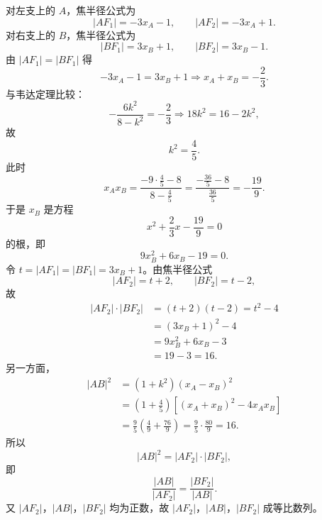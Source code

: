 \begin{answer}
对左支上的 $A$，焦半径公式为
\nopagebreak[4]
\[|AF_1|=-3x_A-1,\qquad |AF_2|=-3x_A+1.\]
对右支上的 $B$，焦半径公式为
\nopagebreak[4]
\[|BF_1|=3x_B+1,\qquad |BF_2|=3x_B-1.\]
由 $|AF_1|=|BF_1|$ 得
\nopagebreak[4]
\[-3x_A-1=3x_B+1
\Longrightarrow x_A+x_B=-\frac23.\]
与韦达定理比较：
\nopagebreak[4]
\[-\frac{6k^2}{8-k^2}=-\frac23
\Longrightarrow 18k^2=16-2k^2,\]
故
\nopagebreak[4]
\[k^2=\frac45.\]
此时
\nopagebreak[4]
\[x_Ax_B
=\frac{-9\cdot\frac45-8}{8-\frac45}
=\frac{-\frac{36}5-8}{\frac{36}5}
=-\frac{19}9.\]
于是 $x_B$ 是方程
\nopagebreak[4]
\[x^2+\frac23x-\frac{19}9=0\]
的根，即
\nopagebreak[4]
\[9x_B^2+6x_B-19=0.\]
令 $t=|AF_1|=|BF_1|=3x_B+1$。由焦半径公式
\nopagebreak[4]
\[|AF_2|=t+2,\qquad |BF_2|=t-2,\]
故
\nopagebreak[4]
\[\begin{aligned}
|AF_2|\cdot|BF_2|
&=(t+2)(t-2)=t^2-4\\
&=(3x_B+1)^2-4\\
&=9x_B^2+6x_B-3\\
&=19-3=16.
\end{aligned}\]
另一方面，
\nopagebreak[4]
\[\begin{aligned}
|AB|^2
&=(1+k^2)(x_A-x_B)^2\\
&=\left(1+\frac45\right)
\left[(x_A+x_B)^2-4x_Ax_B\right]\\
&=\frac95\left(\frac49+\frac{76}9\right)
=\frac95\cdot\frac{80}9=16.
\end{aligned}\]
所以
\nopagebreak[4]
\[|AB|^2=|AF_2|\cdot|BF_2|,\]
即
\nopagebreak[4]
\[\frac{|AB|}{|AF_2|}=\frac{|BF_2|}{|AB|}.\]
又 $|AF_2|$，$|AB|$，$|BF_2|$ 均为正数，故 $|AF_2|$，$|AB|$，$|BF_2|$ 成等比数列。



\end{answer}